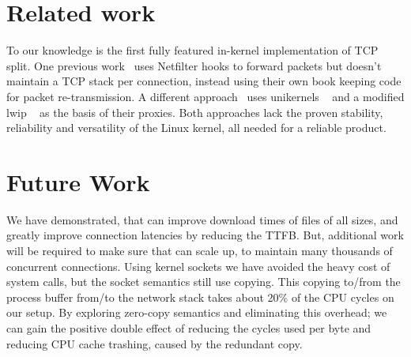 \section{Related work}
To our knowledge \oursys is the first fully featured in-kernel implementation of TCP split.
One previous work~\cite{kernelsplit} uses Netfilter hooks to forward packets but doesn't maintain a TCP stack per connection, instead using their own book keeping code for packet re-transmission.
A different approach~\cite{siracusano2016miniproxy} uses unikernels ~\cite{kivity2014v} and a modified lwip ~\cite{dunkels2001design} as the basis of their proxies. Both approaches lack the proven stability, reliability and versatility of the Linux kernel, all needed for a reliable product.

\section{Future Work}
We have demonstrated, that \oursys can improve download times of files of all sizes, and greatly improve connection latencies by reducing the TTFB. But, additional work will be required to make sure that \oursys
can scale up, to maintain many thousands of concurrent connections. Using kernel sockets we have avoided the heavy cost of system calls, but the socket semantics still use copying. This copying to/from the process buffer from/to the network stack takes about 20\% of the CPU cycles on our setup. By exploring zero-copy semantics and eliminating this overhead; we can gain the positive double effect of reducing the cycles used per byte and reducing CPU cache trashing, caused by the redundant copy.